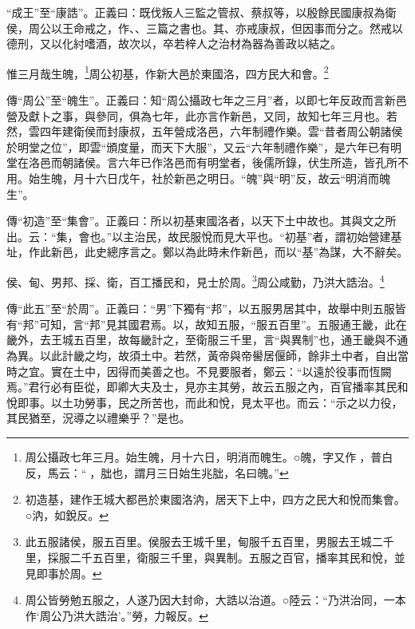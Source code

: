 {\noindent\shu{}\fzkt “成王”至“康誥”。正義曰：既伐叛人三監之管叔、蔡叔等，以殷餘民國康叔為衛侯，周公以王命戒之，作、、三篇之書也。其、亦戒康叔，但因事而分之。然戒以德刑，又以化紂嗜酒，故次以，卒若梓人之治材為器為善政以結之。 \par}

惟三月哉生魄，\footnote{周公攝政七年三月。始生魄，月十六日，明消而魄生。○魄，字又作𩲸，普白反，馬云：“𩲸，朏也，謂月三日始生兆朏，名曰魄。”}周公初基，作新大邑於東國洛，四方民大和會。\footnote{初造基，建作王城大都邑於東國洛汭，居天下上中，四方之民大和悅而集會。○汭，如銳反。}


{\noindent\zhuan{}\fzbyks 傳“周公”至“魄生”。正義曰：知“周公攝政七年之三月”者，以即七年反政而言新邑營及獻卜之事，與參同，俱為七年，此亦言作新邑，又同，故知七年三月也。若然，雲四年建衛侯而封康叔，五年營成洛邑，六年制禮作樂。雲“昔者周公朝諸侯於明堂之位”，即雲“頒度量，而天下大服”，又云“六年制禮作樂”，是六年已有明堂在洛邑而朝諸侯。言六年已作洛邑而有明堂者，後儒所錄，伏生所造，皆孔所不用。始生魄，月十六日戊午，社於新邑之明日。“魄”與“明”反，故云“明消而魄生”。 \par}

{\noindent\zhuan{}\fzbyks 傳“初造”至“集會”。正義曰：所以初基東國洛者，以天下土中故也。其與文之所出。云：“集，會也。”以主治民，故民服悅而見大平也。“初基”者，謂初始營建基址，作此新邑，此史總序言之。鄭以為此時未作新邑，而以“基”為謀，大不辭矣。 \par}

侯、甸、男邦、採、衛，百工播民和，見士於周。\footnote{此五服諸侯，服五百里。侯服去王城千里，甸服千五百里，男服去王城二千里，採服二千五百里，衛服三千里，與異制。五服之百官，播率其民和悅，並見即事於周。}周公咸勤，乃洪大誥治。\footnote{周公皆勞勉五服之，人遂乃因大封命，大誥以治道。○陸云：“乃洪治同，一本作‘周公乃洪大誥治’。”勞，力報反。}

{\noindent\zhuan{}\fzbyks 傳“此五”至“於周”。正義曰：“男”下獨有“邦”，以五服男居其中，故舉中則五服皆有“邦”可知，言“邦”見其國君焉。以，故知五服，“服五百里”。五服通王畿，此在畿外，去王城五百里，故每畿計之，至衛服三千里，言“與異制”也，通王畿與不通為異。以此計畿之均，故須土中。若然，黃帝與帝嚳居偃師，餘非土中者，自出當時之宜。實在土中，因得而美善之也。不見要服者，鄭云：“以遠於役事而恆闕焉。”君行必有臣從，即卿大夫及士，見亦主其勞，故云五服之內，百官播率其民和悅即事。以土功勞事，民之所苦也，而此和悅，見太平也。而云：“示之以力役，其民猶至，況導之以禮樂乎？”是也。 \par}

